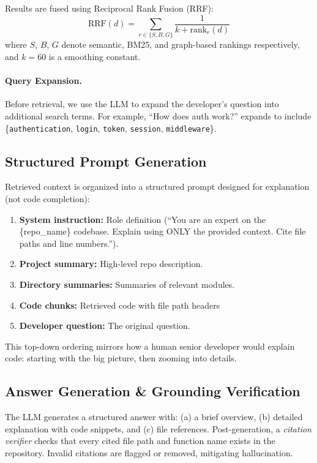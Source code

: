 \documentclass[11pt]{article}
\begin{document}
Results are fused using Reciprocal Rank Fusion (RRF):
\begin{equation}
    \text{RRF}(d) = \sum_{r \in \{S, B, G\}} \frac{1}{k + \text{rank}_r(d)}
\end{equation}
where $S$, $B$, $G$ denote semantic, BM25, and graph-based rankings respectively, and $k=60$ is a smoothing constant.

\paragraph{Query Expansion.} Before retrieval, we use the LLM to expand the developer's question into additional search terms. For example, ``How does auth work?'' expands to include \{\texttt{authentication}, \texttt{login}, \texttt{token}, \texttt{session}, \texttt{middleware}\}.

\subsection{Structured Prompt Generation}
\label{sec:prompts}

Retrieved context is organized into a structured prompt designed for explanation (not code completion):

\begin{enumerate}
    \item \textbf{System instruction:} Role definition (``You are an expert on the \{repo\_name\} codebase. Explain using ONLY the provided context. Cite file paths and line numbers.'').
    \item \textbf{Project summary:} High-level repo description.
    \item \textbf{Directory summaries:} Summaries of relevant modules.
    \item \textbf{Code chunks:} Retrieved code with file path headers
    \item \textbf{Developer question:} The original question.
\end{enumerate}

This top-down ordering mirrors how a human senior developer would explain code: starting with the big picture, then zooming into details.

\subsection{Answer Generation \& Grounding Verification}
\label{sec:generation}

The LLM generates a structured answer with: (a) a brief overview, (b) detailed explanation with code snippets, and (c) file references. Post-generation, a \textit{citation verifier} checks that every cited file path and function name exists in the repository. Invalid citations are flagged or removed, mitigating hallucination.
\end{document}
